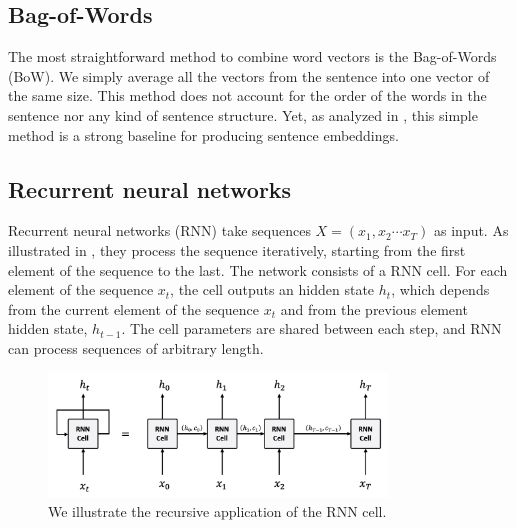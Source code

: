 


\subsection{Bag-of-Words}

The most straightforward method to combine word vectors is the Bag-of-Words (BoW). We simply average all the vectors from the sentence into one vector of the same size. This method does not account for the order of the words in the sentence nor any kind of sentence structure. Yet, as analyzed in \textcite{arora_17}, this simple method is a strong baseline for producing sentence embeddings.

\subsection{Recurrent neural networks}

Recurrent neural networks (RNN) \parencite{hochreiter_97, cho_14} take sequences $X = (x_1, x_2 \cdots x_T)$ as input. As illustrated in , they process the sequence iteratively, starting from the first element of the sequence to the last. The network consists of a RNN cell. For each element of the sequence $x_t$, the cell outputs an hidden state $h_t$, which depends from the current element of the sequence $x_t$ and from the previous element hidden state, $h_{t-1}$. The cell parameters are shared between each step, and RNN can process sequences of arbitrary length.

\begin{figure}[!ht]
	\includegraphics[width=9cm]{images/rnn_cell_unfold.png}
	\caption[RNN cell unfold]{We illustrate the recursive application of the RNN cell.}
\end{figure}

